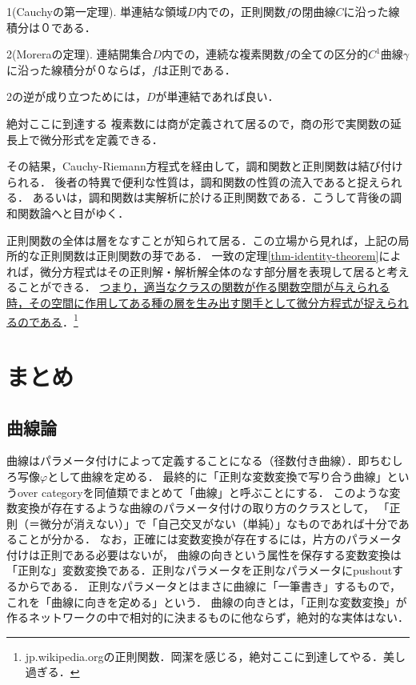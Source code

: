 \documentclass[uplatex, dvipdfmx]{jsreport}
\begin{document}
\begin{theorem}
    1(Cauchyの第一定理). 単連結な領域$D$内での，正則関数$f$の閉曲線$C$に沿った線積分は０である．

    2(Moreraの定理). 連結開集合$D$内での，連続な複素関数$f$の全ての区分的$C^1$曲線$\gamma$に沿った線積分が０ならば，$f$は正則である．

    2の逆が成り立つためには，$D$が単連結であれば良い．
\end{theorem}

\begin{itembox}[l]{絶対ここに到達する}
    複素数には商が定義されて居るので，商の形で実関数の延長上で微分形式を定義できる．

    その結果，Cauchy-Riemann方程式を経由して，調和関数と正則関数は結び付けられる．
    後者の特異で便利な性質は，調和関数の性質の流入であると捉えられる．
    あるいは，調和関数は実解析に於ける正則関数である．こうして背後の調和関数論へと目がゆく．

    正則関数の全体は層をなすことが知られて居る．この立場から見れば，上記の局所的な正則関数は正則関数の芽である．
    一致の定理\ref{thm-identity-theorem}によれば，微分方程式はその正則解・解析解全体のなす部分層を表現して居ると考えることができる．
    \underline{つまり，適当なクラスの関数が作る関数空間が与えられる時，その空間に作用してある種の層を生み出す関手として微分方程式が捉えられるのである}．\footnote{jp.wikipedia.orgの正則関数．岡潔を感じる，絶対ここに到達してやる．美し過ぎる．}
\end{itembox}

\chapter{まとめ}

\section{曲線論}

曲線はパラメータ付けによって定義することになる（径数付き曲線）．即ちむしろ写像$\varphi$として曲線を定める．
最終的に「正則な変数変換で写り合う曲線」というover categoryを同値類でまとめて「曲線」と呼ぶことにする．
このような変数変換が存在するような曲線のパラメータ付けの取り方のクラスとして，
「正則（＝微分が消えない）」で「自己交叉がない（単純）」なものであれば十分であることが分かる．
なお，正確には変数変換が存在するには，片方のパラメータ付けは正則である必要はないが，
曲線の向きという属性を保存する変数変換は「正則な」変数変換である．正則なパラメータを正則なパラメータにpushoutするからである．
正則なパラメータとはまさに曲線に「一筆書き」するもので，これを「曲線に向きを定める」という．
曲線の向きとは，「正則な変数変換」が作るネットワークの中で相対的に決まるものに他ならず，絶対的な実体はない．
\end{document}
